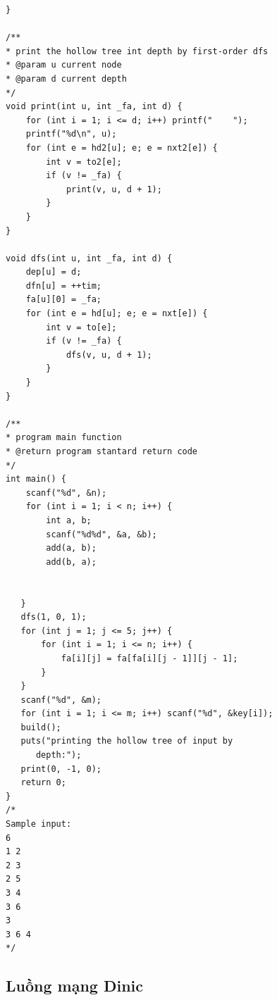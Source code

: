 \documentclass[11pt]{article}
\begin{document}
\begin{verbatim}
}

/**
* print the hollow tree int depth by first-order dfs
* @param u current node
* @param d current depth
*/
void print(int u, int _fa, int d) {
    for (int i = 1; i <= d; i++) printf("    ");
    printf("%d\n", u);
    for (int e = hd2[u]; e; e = nxt2[e]) {
        int v = to2[e];
        if (v != _fa) {
            print(v, u, d + 1);
        }
    }
}

void dfs(int u, int _fa, int d) {
    dep[u] = d;
    dfn[u] = ++tim;
    fa[u][0] = _fa;
    for (int e = hd[u]; e; e = nxt[e]) {
        int v = to[e];
        if (v != _fa) {
            dfs(v, u, d + 1);
        }
    }
}

/**
* program main function
* @return program stantard return code
*/
int main() {
    scanf("%d", &n);
    for (int i = 1; i < n; i++) {
        int a, b;
        scanf("%d%d", &a, &b);
        add(a, b);
        add(b, a);


   }
   dfs(1, 0, 1);
   for (int j = 1; j <= 5; j++) {
       for (int i = 1; i <= n; i++) {
           fa[i][j] = fa[fa[i][j - 1]][j - 1];
       }
   }
   scanf("%d", &m);
   for (int i = 1; i <= m; i++) scanf("%d", &key[i]);
   build();
   puts("printing the hollow tree of input by 
      depth:");
   print(0, -1, 0);
   return 0;
}
/*
Sample input:
6
1 2
2 3
2 5
3 4
3 6
3
3 6 4
*/
\end{verbatim}
\endgroup

\subsection{Luồng mạng Dinic}
\end{document}
